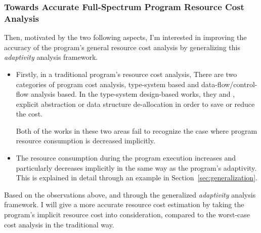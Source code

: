 \subsubsection{Towards Accurate Full-Spectrum Program Resource Cost Analysis}
\label{subsec:intro-cost}

Then, motivated by the two following aspects, I'm interested in improving the accuracy of the program's general resource cost analysis
by generalizing this \emph{adaptivity} analysis framework.
\begin{itemize}
 \item Firstly, in a traditional program's resource cost analysis,
 There are two categories of program cost analysis, type-system based and data-flow/control-flow analysis based. 
 In the type-system design-based works, they \cite{GustafssonEL05} and \cite{hoffmann_jost_2022}, explicit abstraction or data structure de-allocation in order to save or reduce the cost.
 
 Both of the
 works in these two areas fail to recognize the case where program resource consumption is decreased implicitly.
 \item The resource consumption during the program 
 execution increases and particularly decreases implicitly in the same way as the program's adaptivity. This is explained in detail through an example in Section~\ref*{sec:generalization}.
\end{itemize}
 Based on the observations above, and through the generalized \emph{adaptivity} analysis framework.
 I will give
 a more accurate resource cost estimation by taking the program's implicit resource cost into consideration, compared 
 to the worst-case cost analysis in the traditional way.

